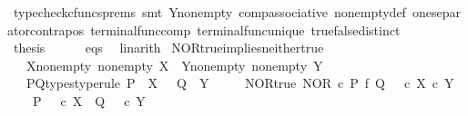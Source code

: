 \begin{isabellebody}
\ {\isacharparenleft}{\kern0pt}typecheck{\isacharunderscore}{\kern0pt}cfuncs{\isacharunderscore}{\kern0pt}prems{\isacharcomma}{\kern0pt}\ smt\ Y{\isacharunderscore}{\kern0pt}nonempty\ comp{\isacharunderscore}{\kern0pt}associative{}\ nonempty{\isacharunderscore}{\kern0pt}def\ one{\isacharunderscore}{\kern0pt}separator{\isacharunderscore}{\kern0pt}contrapos\ terminal{\isacharunderscore}{\kern0pt}func{\isacharunderscore}{\kern0pt}comp\ terminal{\isacharunderscore}{\kern0pt}func{\isacharunderscore}{\kern0pt}unique\ true{\isacharunderscore}{\kern0pt}false{\isacharunderscore}{\kern0pt}distinct{\isacharparenright}{\kern0pt}\isanewline
\ \ \isamarkupfalse%
\isanewline
\ \ \isamarkupfalse%
\ \isamarkupfalse%
\ {\isacharquery}{\kern0pt}thesis\isanewline
\ \ \ \ \isamarkupfalse%
\ eqs\ \isamarkupfalse%
\ linarith\isanewline
{}\isamarkupfalse%
%
\endisatagproof
{\isafoldproof}%
%
\isadelimproof
\isanewline
%
\endisadelimproof
\isanewline
{}\isamarkupfalse%
\ NOR{\isacharunderscore}{\kern0pt}true{\isacharunderscore}{\kern0pt}implies{\isacharunderscore}{\kern0pt}neither{\isacharunderscore}{\kern0pt}true{\isacharcolon}{\kern0pt}\isanewline
\ \ \ X{\isacharunderscore}{\kern0pt}nonempty{\isacharcolon}{\kern0pt}\ {\isachardoublequoteopen}nonempty\ X{\isachardoublequoteclose}\ \ Y{\isacharunderscore}{\kern0pt}nonempty{\isacharcolon}{\kern0pt}\ {\isachardoublequoteopen}nonempty\ Y{\isachardoublequoteclose}\isanewline
\ \ \ P{\isacharunderscore}{\kern0pt}Q{\isacharunderscore}{\kern0pt}types{\isacharbrackleft}{\kern0pt}type{\isacharunderscore}{\kern0pt}rule{\isacharbrackright}{\kern0pt}{\isacharcolon}{\kern0pt}\ {\isachardoublequoteopen}P\ {\isacharcolon}{\kern0pt}\ X\ {\isasymrightarrow}\ {\isasymOmega}{\isachardoublequoteclose}\ {\isachardoublequoteopen}Q\ {\isacharcolon}{\kern0pt}\ Y\ {\isasymrightarrow}\ {\isasymOmega}{\isachardoublequoteclose}\isanewline
\ \ \ NOR{\isacharunderscore}{\kern0pt}true{\isacharcolon}{\kern0pt}\ {\isachardoublequoteopen}NOR\ {\isasymcirc}\isactrlsub c\ {\isacharparenleft}{\kern0pt}P\ {\isasymtimes}\isactrlsub f\ Q{\isacharparenright}{\kern0pt}\ {\isacharequal}{\kern0pt}\ {\isasymt}\ {\isasymcirc}\isactrlsub c\ {\isasymbeta}\isactrlbsub X\ {\isasymtimes}\isactrlsub c\ Y\isactrlesub {\isachardoublequoteclose}\isanewline
\ \ \ {\isachardoublequoteopen}{\isasymnot}\ {\isacharparenleft}{\kern0pt}{\isacharparenleft}{\kern0pt}P\ {\isacharequal}{\kern0pt}\ {\isasymt}\ {\isasymcirc}\isactrlsub c\ {\isasymbeta}\isactrlbsub X\isactrlesub {\isacharparenright}{\kern0pt}\ {\isasymor}\ {\isacharparenleft}{\kern0pt}Q\ {\isacharequal}{\kern0pt}\ {\isasymt}\ {\isasymcirc}\isactrlsub c\ {\isasymbeta}\isactrlbsub Y\isactrlesub {\isacharparenright}{\kern0pt}{\isacharparenright}{\kern0pt}{\isachardoublequoteclose}\isanewline

\end{isabellebody}
